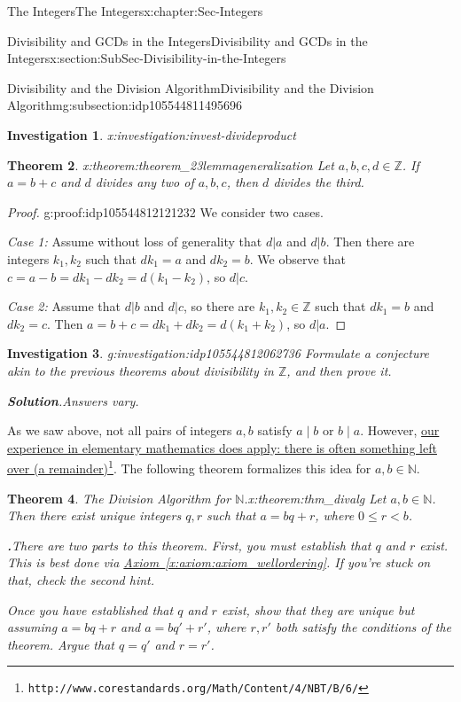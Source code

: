 \documentclass[oneside,10pt,]{book}
\newcommand{\blocktitlefont}{\relax}
\newcommand{\xreffont}{\relax}
\numberwithin{equation}{section}
\renewcommand{\le}{\leqslant}
\def\Z{{\mathbb Z}}
\def\N{{\mathbb N}}
\newtheorem{theorem}{Theorem}[section]
\newtheorem{investigation}[theorem]{Investigation}
\newcommand{\lt}{<}
\begin{document}
\begin{chapterptx}{The Integers}{}{The Integers}{}{}{x:chapter:Sec-Integers}
\begin{sectionptx}{Divisibility and GCDs in the Integers}{}{Divisibility and GCDs in the Integers}{}{}{x:section:SubSec-Divisibility-in-the-Integers}
\begin{subsectionptx}{Divisibility and the Division Algorithm}{}{Divisibility and the Division Algorithm}{}{}{g:subsection:idp105544811495696}
\begin{investigation}{}{x:investigation:invest-divideproduct}
\end{investigation}%
\begin{theorem}{}{}{x:theorem:theorem_23lemmageneralization}%
Let \(a,b,c,d\in \Z\). If \(a = b+c\) and \(d\) divides any two of \(a,b,c\), then \(d\) divides the third.%
\end{theorem}
\begin{proof}{}{g:proof:idp105544812121232}
We consider two cases.%
\par
\emph{Case 1:} Assume without loss of generality that \(d|a\) and \(d|b\). Then there are integers \(k_1, k_2\) such that \(d k_1 = a\) and \(d k_2 = b\). We observe that \(c = a - b = d k_1 - d k_2 = d(k_1 - k_2)\), so \(d|c\).%
\par
\emph{Case 2:} Assume that \(d| b\) and \(d|c\), so there are \(k_1,k_2\in \Z\) such that \(d k_1 = b\) and \(d k_2 = c\). Then \(a = b+ c = dk_1 + dk_2 = d(k_1 + k_2)\), so \(d|a\).%
\end{proof}
\begin{investigation}{}{g:investigation:idp105544812062736}%
Formulate a conjecture akin to the previous theorems about divisibility in \(\Z\), and then prove it.%
\par\smallskip%
\noindent\textbf{\blocktitlefont Solution}.\hypertarget{g:solution:idp105544812063888}{}\quad{}Answers vary.%
\end{investigation}%
As we saw above, not all pairs of integers \(a,b\) satisfy \(a\mid b\) or \(b\mid a\). However, \href{http://www.corestandards.org/Math/Content/4/NBT/B/6/}{our experience in elementary mathematics does apply: there is often something left over (a remainder)}\footnote{\nolinkurl{http://www.corestandards.org/Math/Content/4/NBT/B/6/}\label{g:fn:idp105544812066064}}. The following theorem formalizes this idea for \(a,b\in \N\).%
\begin{theorem}{The Division Algorithm for \(\N\).}{}{x:theorem:thm_divalg}%
\index{Division Algorithm (\(\N\))}%
Let \(a,b\in \N\). Then there exist unique integers \(q,r\) such that \(a = bq + r\), where \(0 \le r \lt b\).%
\par\smallskip%
\noindent\textbf{\blocktitlefont 1.}\quad{}There are two parts to this theorem. First, you must establish that \(q\) and \(r\) exist. This is best done via \hyperref[x:axiom:axiom_wellordering]{Axiom~{\xreffont\ref{x:axiom:axiom_wellordering}}}. If you're stuck on that, check the second hint.%
\par
Once you have established that \(q\) and \(r\) exist, show that they are unique but assuming \(a = bq+r\) and \(a = bq' + r'\), where \(r,r'\) both satisfy the conditions of the theorem. Argue that \(q = q'\) and \(r = r'\).%

\end{theorem}
\end{subsectionptx}
\end{sectionptx}
\end{chapterptx}
\end{document}
